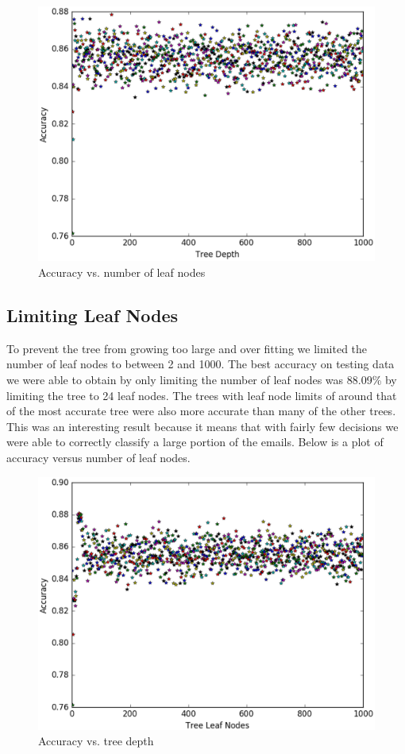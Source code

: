 \documentclass{article} %
\begin{document}
\begin{figure}[H]
\includegraphics[scale=.75]{accuracy-vs-depth}
\caption{Accuracy vs. number of leaf nodes}
\end{figure}

\subsection{Limiting Leaf Nodes}
To prevent the tree from growing too large and over fitting we limited the number of leaf nodes to between 2 and 1000. The best accuracy on testing data we were able to obtain by only limiting the number of leaf nodes was 88.09\% by limiting the tree to 24 leaf nodes. The trees with leaf node limits of around that of the most accurate tree were also more accurate than many of the other trees. This was an interesting result because it means that with fairly few decisions we were able to correctly classify a large portion of the emails. Below is a plot of accuracy versus number of leaf nodes.
\begin{figure}[H]
\includegraphics[scale=.75]{accuracy-vs-nodes}
\caption{Accuracy vs. tree depth}
\end{figure}
\end{document}
